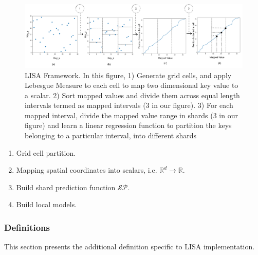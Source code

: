 \begin{figure}[t]
    \centering
	\includegraphics[width=1\textwidth]{graphs/implementation/lisa_overview.pdf}
    \caption{LISA Framework. In this figure, 1) Generate grid cells, and apply Lebesgue Measure to each cell to map two dimensional key value to a scalar. 2) Sort mapped values and divide them across equal length intervals termed as mapped intervals (3 in our figure). 3) For each mapped interval, divide the mapped value range in shards  (3 in our figure) and learn a linear regression function to partition the keys belonging to a particular interval, into different shards }
    \label{fig:LISA_Framework}
\end{figure}

\begin{enumerate}
	\item Grid cell partition.
	\item Mapping spatial coordinates into scalars, i.e. $\mathbb{R}^d\to\mathbb{R}$.
	\item Build shard prediction function $\mathcal{SP}$.
	\item Build local models.
\end{enumerate}

\subsubsection{Definitions}

This section presents the additional definition specific to LISA implementation.

